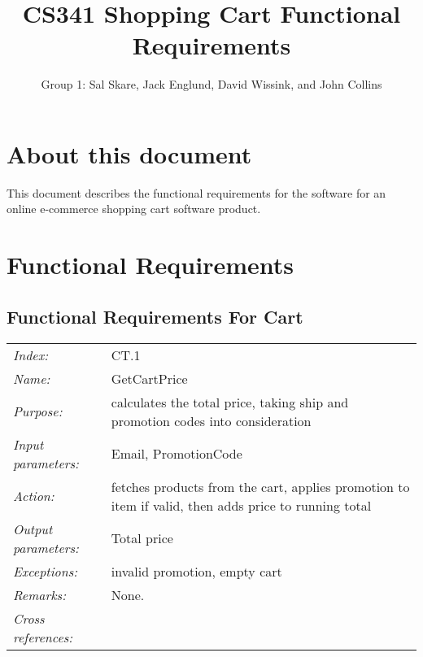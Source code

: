 \documentclass[10pt,letter]{article}
\begin{document}

\title{CS341 Shopping Cart Functional Requirements}

\author{Group 1: Sal Skare, Jack Englund, David Wissink, and John Collins}

\maketitle 

\section{About this document} This document describes the functional requirements for the 
software for an online e-commerce shopping cart software product.

\section{Functional Requirements}

\subsection{Functional Requirements For Cart}

\begin{tabularx}{\textwidth}{l X}
    \it{Index:} & CT.1 \\
    \it{Name:} & GetCartPrice \\
    \it{Purpose:} & calculates the total price, taking ship and promotion codes into consideration \\
    \it{Input parameters:} & Email, PromotionCode \\
    \it{Action:} &  fetches products from the cart, applies promotion to item if valid, then adds price to running total\\
    \it{Output parameters:} & Total price  \\
    \it{Exceptions:} &  invalid promotion, empty cart\\
    \it{Remarks:} & None. \\
    \it{Cross references:} & \\
    \hline
\end{tabularx}
\end{document}
